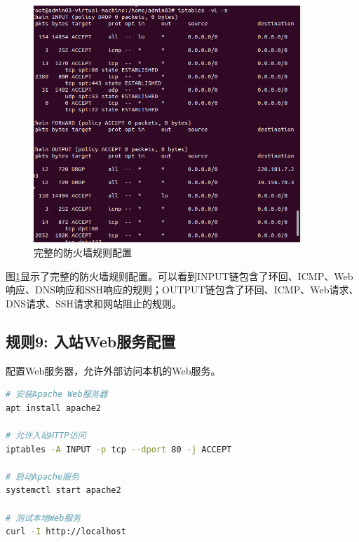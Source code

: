 \documentclass[12pt,a4paper]{article}
\begin{document}
\begin{figure}[H]
    \centering
    \includegraphics[width=0.9\textwidth]{09_complete_rules.png}
    \caption{完整的防火墙规则配置}
    \label{fig:complete_rules}
\end{figure}

图\ref{fig:complete_rules}显示了完整的防火墙规则配置。可以看到INPUT链包含了环回、ICMP、Web响应、DNS响应和SSH响应的规则；OUTPUT链包含了环回、ICMP、Web请求、DNS请求、SSH请求和网站阻止的规则。

\subsection{规则9: 入站Web服务配置}

配置Web服务器，允许外部访问本机的Web服务。

\begin{lstlisting}[language=bash, caption=配置入站Web服务]
# 安装Apache Web服务器
apt install apache2

# 允许入站HTTP访问
iptables -A INPUT -p tcp --dport 80 -j ACCEPT

# 启动Apache服务
systemctl start apache2

# 测试本地Web服务
curl -I http://localhost
\end{lstlisting}
\end{document}
